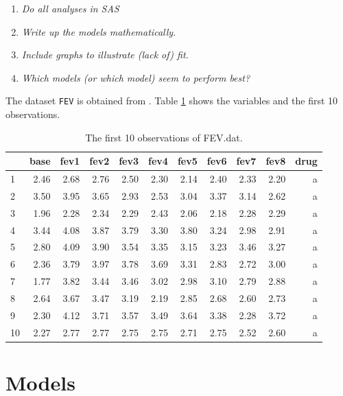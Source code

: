 \documentclass[a4paper,oneside]{memoir}
\begin{document}
\begin{enumerate}
\def\labelenumi{\arabic{enumi}.}
\item
  \emph{Do all analyses in SAS}
\item
  \emph{Write up the models mathematically.}
\item
  \emph{Include graphs to illustrate (lack of) fit.}
\item
  \emph{Which models (or which model) seem to perform best?}
\end{enumerate}

The dataset \texttt{FEV} is obtained from \citep{FEV}. Table \ref{tab:FEV} shows the variables and the first 10 observations.

\begin{table}[!h]

\caption{\label{tab:FEV}The first 10 observations of FEV.dat.}
\centering
\begin{tabular}{lrrrrrrrrrr}
\toprule
  & base & fev1 & fev2 & fev3 & fev4 & fev5 & fev6 & fev7 & fev8 & drug\\
\midrule
\rowcolor{gray!6}  1 & 2.46 & 2.68 & 2.76 & 2.50 & 2.30 & 2.14 & 2.40 & 2.33 & 2.20 & a\\
2 & 3.50 & 3.95 & 3.65 & 2.93 & 2.53 & 3.04 & 3.37 & 3.14 & 2.62 & a\\
\rowcolor{gray!6}  3 & 1.96 & 2.28 & 2.34 & 2.29 & 2.43 & 2.06 & 2.18 & 2.28 & 2.29 & a\\
4 & 3.44 & 4.08 & 3.87 & 3.79 & 3.30 & 3.80 & 3.24 & 2.98 & 2.91 & a\\
\rowcolor{gray!6}  5 & 2.80 & 4.09 & 3.90 & 3.54 & 3.35 & 3.15 & 3.23 & 3.46 & 3.27 & a\\
6 & 2.36 & 3.79 & 3.97 & 3.78 & 3.69 & 3.31 & 2.83 & 2.72 & 3.00 & a\\
\rowcolor{gray!6}  7 & 1.77 & 3.82 & 3.44 & 3.46 & 3.02 & 2.98 & 3.10 & 2.79 & 2.88 & a\\
8 & 2.64 & 3.67 & 3.47 & 3.19 & 2.19 & 2.85 & 2.68 & 2.60 & 2.73 & a\\
\rowcolor{gray!6}  9 & 2.30 & 4.12 & 3.71 & 3.57 & 3.49 & 3.64 & 3.38 & 2.28 & 3.72 & a\\
10 & 2.27 & 2.77 & 2.77 & 2.75 & 2.75 & 2.71 & 2.75 & 2.52 & 2.60 & a\\
\bottomrule
\end{tabular}
\end{table}

\hypertarget{models}{%
\section{Models}\label{models}}
\end{document}
